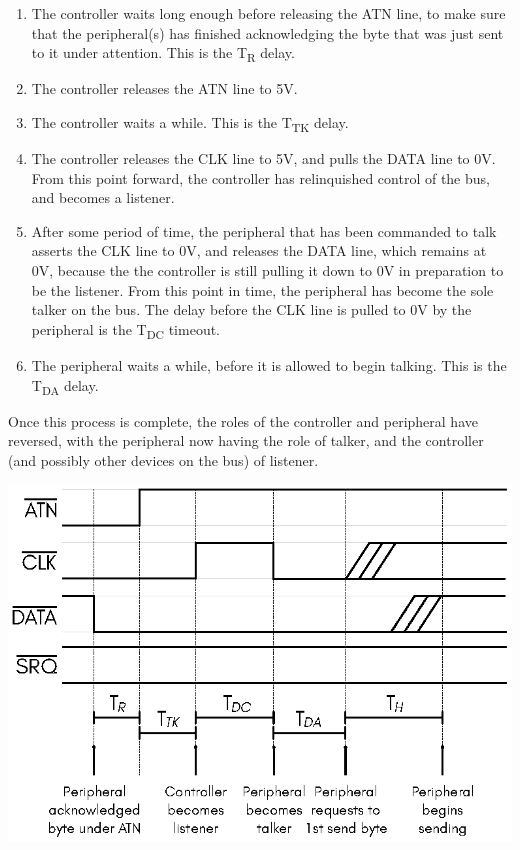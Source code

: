 \begin{enumerate}
\item The controller waits long enough before releasing the
ATN line, to make sure that the peripheral(s) has finished acknowledging the
byte that was just sent to it under attention. This is the T\textsubscript{R} delay.
\item The controller releases the ATN line to 5V.
\item The controller waits a while. This is the T\textsubscript{TK} delay.
\item The controller releases the CLK line to 5V, and pulls the DATA
  line to 0V. From this point
  forward, the controller has relinquished control of the bus, and
  becomes a listener.
\item After some period of time, the peripheral that has been
  commanded to talk asserts the CLK line to 0V, and releases the DATA
  line, which remains at 0V, because the the controller is still
  pulling it down to 0V in preparation to be the listener.
  From this point
  in time, the peripheral has become the sole talker on the
  bus. The delay before the CLK line is pulled to 0V by the
  peripheral is the T\textsubscript{DC} timeout.
\item The peripheral waits a while, before it is allowed to
  begin talking. This is the T\textsubscript{DA} delay.
\end{enumerate}

Once this process is complete, the roles of the controller and
peripheral have reversed, with the peripheral now having the role of
talker, and the controller (and possibly other devices on the bus) of
listener.

\begin{center}
\includegraphics{images/IEC-Timing-Diagrams/IEC-Timing-Diagram-TurnAround}
\end{center}

